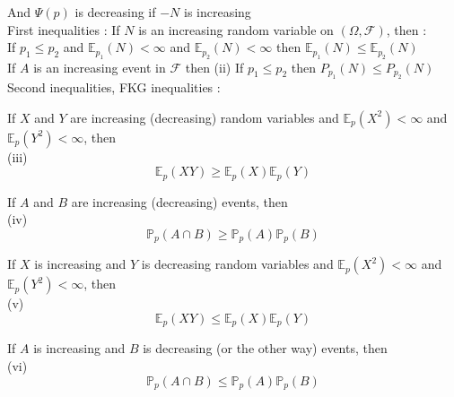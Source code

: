 \documentclass{article}
\begin{document}
And $\Psi(p)$ is decreasing if $-N$ is increasing \\

First inequalities :
If $N$ is an increasing random variable on $(\Omega, \mathscr{F})$, then : \\
If $p_1 \leq p_2$ and $\mathbb{E}_{p_1}(N) < \infty$ and $\mathbb{E}_{p_2}(N) < \infty$ then $\mathbb{E}_{p_1}(N) \leq \mathbb{E}_{p_2}(N)$ \\

If $A$ is an increasing event in $\mathscr{F}$ then
(ii) If $p_1 \leq p_2$ then $P_{p_1}(N) \leq P_{p_2}(N)$ \\

Second inequalities, FKG inequalities :

If $X$ and $Y$ are increasing (decreasing) random variables and $\mathbb{E}_p{(X^2)} < \infty$ and $\mathbb{E}_p{(Y^2)} < \infty$, then \\
(iii)
$$\mathbb{E}_p(XY) \geq \mathbb{E}_p(X)\mathbb{E}_p(Y)$$

If $A$ and $B$ are increasing (decreasing) events, then \\
(iv)
$$\mathbb{P}_p(A \cap B) \geq \mathbb{P}_p(A)\mathbb{P}_p(B)$$

If  $X$ is increasing and $Y$ is decreasing random variables and $\mathbb{E}_p{(X^2)} < \infty$ and $\mathbb{E}_p{(Y^2)} < \infty$, then \\
(v)
$$\mathbb{E}_p(XY) \leq \mathbb{E}_p(X)\mathbb{E}_p(Y)$$

If $A$ is increasing and $B$ is decreasing (or the other way) events, then \\
(vi)
$$\mathbb{P}_p(A \cap B) \leq \mathbb{P}_p(A)\mathbb{P}_p(B)$$
\end{document}
